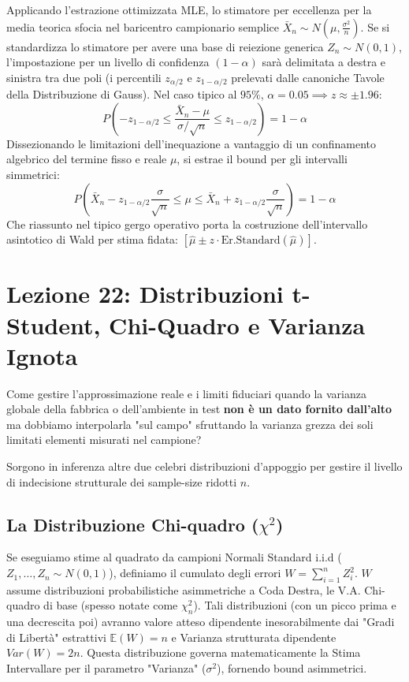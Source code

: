 \documentclass[12pt, a4paper]{article}
\begin{document}
Applicando l'estrazione ottimizzata MLE, lo stimatore per eccellenza per la media teorica sfocia nel baricentro campionario semplice $\bar{X}_n \sim N(\mu, \frac{\sigma^2}{n})$.
Se si standardizza lo stimatore per avere una base di reiezione generica $Z_n \sim N(0, 1)$, l'impostazione per un livello di confidenza $(1-\alpha)$ sarà delimitata a destra e sinistra tra due poli (i percentili $z_{\alpha/2}$ e $z_{1-\alpha/2}$ prelevati dalle canoniche Tavole della Distribuzione di Gauss). 
Nel caso tipico al $95\%$, $\alpha=0.05 \implies z \approx \pm 1.96$:
$$ P\left(-z_{1-\alpha/2} \le \frac{\bar{X}_n - \mu}{\sigma / \sqrt{n}} \le z_{1-\alpha/2}\right) = 1-\alpha $$
Dissezionando le limitazioni dell'inequazione a vantaggio di un confinamento algebrico del termine fisso e reale $\mu$, si estrae il bound per gli intervalli simmetrici:
$$ P\left(\bar{X}_n - z_{1-\alpha/2} \frac{\sigma}{\sqrt{n}} \le \mu \le \bar{X}_n + z_{1-\alpha/2} \frac{\sigma}{\sqrt{n}}\right) = 1-\alpha $$
Che riassunto nel tipico gergo operativo porta la costruzione dell'intervallo asintotico di Wald per stima fidata: $\left[ \hat{\mu} \pm z \cdot \text{Er.Standard}(\hat{\mu}) \right]$.


\section{Lezione 22: Distribuzioni t-Student, Chi-Quadro e Varianza Ignota}

Come gestire l'approssimazione reale e i limiti fiduciari quando la varianza globale della fabbrica o dell'ambiente in test \textbf{non è un dato fornito dall'alto} ma dobbiamo interpolarla "sul campo" sfruttando la varianza grezza dei soli limitati elementi misurati nel campione?

Sorgono in inferenza altre due celebri distribuzioni d'appoggio per gestire il livello di indecisione strutturale dei sample-size ridotti $n$.

\newpage

\subsection{La Distribuzione Chi-quadro (\texorpdfstring{$\chi^2$}{chi2})}
Se eseguiamo stime al quadrato da campioni Normali Standard i.i.d ($Z_1, \dots, Z_n \sim N(0,1)$), definiamo il cumulato degli errori $W = \sum_{i=1}^n Z_i^2$. 
$W$ assume distribuzioni probabilistiche asimmetriche a Coda Destra, le V.A. Chi-quadro di base (spesso notate come $\chi^2_n$).
Tali distribuzioni (con un picco prima e una decrescita poi) avranno valore atteso dipendente inesorabilmente dai "Gradi di Libertà" estrattivi $\mathbb{E}(W) = n$ e Varianza strutturata dipendente $Var(W) = 2n$.
Questa distribuzione governa matematicamente la Stima Intervallare per il parametro "Varianza" ($\sigma^2$), fornendo bound asimmetrici.
\end{document}

